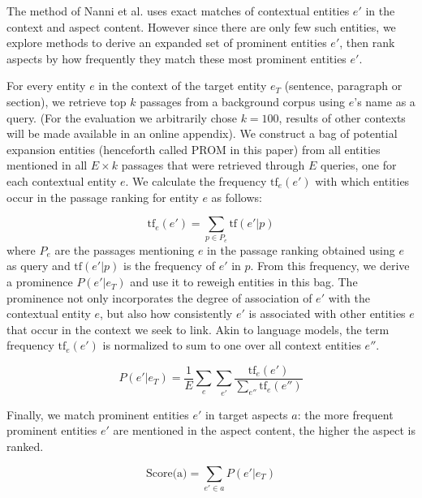 The method of Nanni et al. uses exact matches of contextual entities $e'$ in the context and aspect content. However since there are only few such entities, we explore methods to derive an expanded set of prominent entities $e'$, then rank aspects by how frequently they match these most prominent entities $e'$. 

For every entity $e$ in the context of the target entity $e_T$ (sentence, paragraph or section), we retrieve top $k$ passages from a background corpus using $e$'s name as a query. (For the evaluation we arbitrarily chose $k=100$, results of other contexts will be made available in an online appendix). We construct a bag of potential expansion entities (henceforth called PROM in this paper) from all entities mentioned in all $E \times k$ passages that were retrieved through $E$ queries, one for each contextual entity $e$. We calculate the frequency $\text{tf}_{e}(e')$ with which entities occur in the passage ranking for entity $e$ as follows:

\begin{equation}
\label{eq:frequency-of-co-occurring-ent}
    \text{tf}_{e}(e')=\sum_{p\in P_e}\text{tf}(e'\vert p)
\end{equation}
where $P_e$ are the passages mentioning $e$ in the passage ranking obtained using $e$ as query and $\text{tf}(e'\vert p)$ is the frequency of $e'$ in $p$.
%
From this frequency, we derive a prominence $P(e'\vert e_T)$ and use it to reweigh entities in this bag. The prominence not only incorporates the degree of association of $e'$ with the contextual entity $e$, but also how consistently $e'$ is associated with other entities $e$ that occur in the context we seek to link. Akin to language models, the term frequency $\text{tf}_{e}(e')$ is normalized to sum to one over all context entities $e''$.

    \begin{equation}
    \label{eq:prominence}
        P(e' \vert e_T) =  \frac{1}{E} \sum_e  \sum_{e'} \frac{\text{tf}_{e}(e')}{\sum_{e''}\text{tf}_{e}(e'')}
    \end{equation}



Finally, we match prominent entities $e'$ in target aspects $a$: the more frequent  prominent entities $e'$ are mentioned in the aspect content, the higher the aspect is ranked. 

    \begin{equation}
    \label{eq:score-aspect-using-simple-freq-dist}
        \text{Score(a)} = \sum_{e' \in a}P(e' \vert e_T)
    \end{equation}



